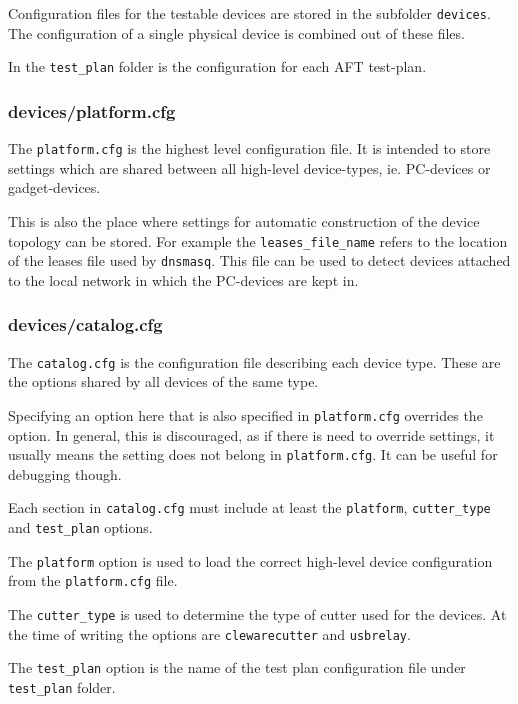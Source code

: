 \documentclass[a4paper,11pt]{article}
\newcommand{\cmd}[1]{\texttt{#1}}
\begin{document}
Configuration files for the testable devices are stored in the subfolder \cmd{devices}. The configuration of a single physical device is combined out of these files.

In the \cmd{test\_plan} folder is the configuration for each AFT test-plan.

\subsubsection*{devices/platform.cfg}
The \cmd{platform.cfg} is the highest level configuration file. It is intended to store settings which are shared between all high-level device-types, ie. PC-devices or gadget-devices.

This is also the place where settings for automatic construction of the device topology can be stored. For example the \cmd{leases\_file\_name} refers to the location of the leases file used by \cmd{dnsmasq}. This file can be used to detect devices attached to the local network in which the PC-devices are kept in.

\subsubsection*{devices/catalog.cfg}
The \cmd{catalog.cfg} is the configuration file describing each device type. These are the options shared by all devices of the same type.

Specifying an option here that is also specified in \cmd{platform.cfg} overrides the option. In general, this is discouraged, as if there is need to override settings, it usually means the setting does not belong in \cmd{platform.cfg}. It can be useful for debugging though.

Each section in \cmd{catalog.cfg} must include at least the \cmd{platform}, \cmd{cutter\_type} and \cmd{test\_plan} options.

The \cmd{platform} option is used to load the correct high-level device configuration from the \cmd{platform.cfg} file. 

The \cmd{cutter\_type} is used to determine the type of cutter used for the devices. At the time of writing the options are \cmd{clewarecutter} and \cmd{usbrelay}.

The \cmd{test\_plan} option is the name of the test plan configuration file under \cmd{test\_plan} folder.
\end{document}
